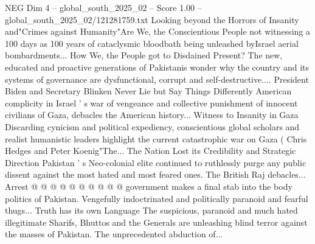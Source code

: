 \begin{textsample}{NEG Dim 4 – global\_south\_2025\_02 – Score 1.00 – global\_south\_2025\_02/121281759.txt}
Looking beyond the Horrors of Insanity and"Crimes against Humanity"Are We, the Conscientious People not witnessing a 100 days as 100 years of cataclysmic bloodbath being unleashed byIsrael aerial bombardments...
How We, the People got to Disdained Present?
The new, educated and proactive generations of Pakistanis wonder why the country and its systems of governance are dysfunctional, corrupt and self-destructive....
President Biden and Secretary Blinken Never Lie but Say Things Differently American complicity in Israel ' s war of vengeance and collective punishment of innocent civilians of Gaza, debacles the American history...
Witness to Insanity in Gaza Discarding cynicism and political expediency, conscientious global scholars and realist humanistic leaders highlight the current catastrophic war on Gaza ( Chris Hedges and Peter Koenig"The...
The Nation Lost its Credibility and Strategic Direction Pakistan ' s Neo-colonial elite continued to ruthlessly purge any public dissent against the most hated and most feared ones.
The British Raj debacles...
Arrest @ @ @ @ @ @ @ @ @ @ government makes a final stab into the body politics of Pakistan.
Vengefully indoctrinated and politically paranoid and fearful thugs...
Truth has its own Language The suspicious, paranoid and much hated illegitimate Sharifs, Bhuttos and the Generals are unleashing blind terror against the masses of Pakistan.
The unprecedented abduction of...

\end{textsample}
